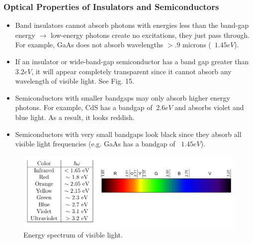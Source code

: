 \documentclass[10pt]{article}
\begin{document}
\subsubsection{Optical Properties of Insulators and Semiconductors}
\begin{itemize}
  \item Band insulators cannot absorb photons with energies less than the band-gap energy $\rightarrow$ low-energy photons create no excitations, they just pass through.
  For example, GaAs does not absorb wavelengths $>.9$ microns (~$1.45 eV$).
  \item If an insulator or wide-band-gap semiconductor has a band gap greater than $3.2eV$, it will appear completely transparent since it cannot absorb
  any wavelength of visible light. See Fig. 15.
  \item Semiconductors with smaller bandgaps may only absorb higher energy photons. For example, CdS has a bandgap of $~2.6 eV$ and absorbs
  violet and blue light. As a result, it looks reddish.
  \item Semiconductors with very small bandgaps look black since they absorb all visible light frequencies (e.g. GaAs has a bandgap of ~$1.45 eV$).
\end{itemize}
\begin{figure}
  \centering
    \includegraphics[width=\textwidth]{tb15}
    \caption{Energy spectrum of visible light.}
\end{figure}
\end{document}
